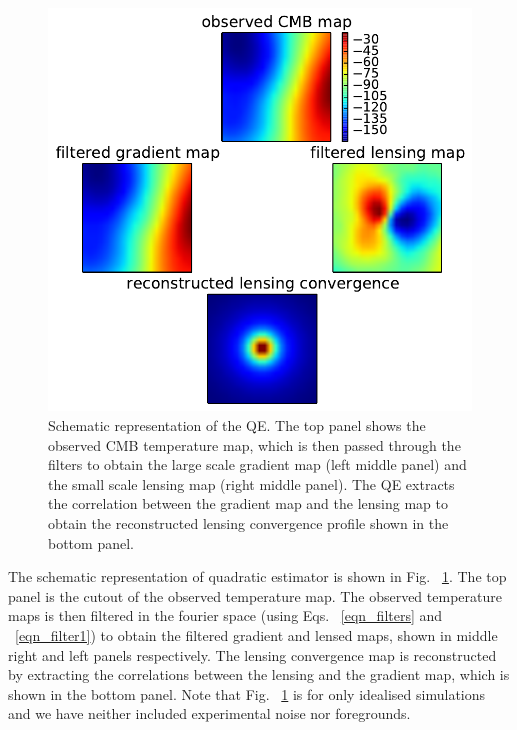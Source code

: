 \begin{figure}[!ht]
\includegraphics[width=\linewidth]{figs/schematic_rep.pdf}
\caption{Schematic representation of the QE. The top panel shows the observed CMB temperature map, which is then passed through the filters to obtain the large scale gradient map (left middle panel) and the small scale lensing map (right middle panel). The QE extracts the correlation between the gradient map and the lensing map to obtain the reconstructed lensing convergence profile shown in the bottom panel.}
\label{fig:QE_schem}
\end{figure}
The schematic representation of quadratic estimator is shown in Fig. ~\ref{fig:QE_schem}. 
The top panel is the \smallboxsize \; cutout of the observed temperature map. 
The observed temperature maps is then filtered in the fourier space (using Eqs. ~\ref{eqn_filters} and ~\ref{eqn_filter1}) to obtain the filtered gradient and lensed maps, shown in middle right and left panels respectively.
The lensing convergence map is reconstructed by extracting the correlations between the lensing and the gradient map, which is shown in the bottom panel.
 Note that Fig. ~\ref{fig:QE_schem} is for only idealised simulations and we have neither included experimental noise nor foregrounds.

